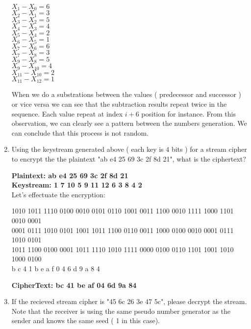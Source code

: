 \documentclass[12]{article}
\begin{document}
\begin{enumerate}
	$X_1 - X_0 = 6$ \\
	$X_2 - X_1 = 3$ \\
	$X_3 - X_2 = 5$ \\
	$X_4 - X_3 = 4$ \\
	$X_5 - X_4 = 2$ \\
	$X_6 - X_5 = 1$ \\
	$X_7 - X_6 = 6$ \\
	$X_7 - X_8 = 3$ \\
	$X_9 - X_8 = 5$ \\
	$X_9 - X_{10} = 4$ \\
	$X_{11} - X_{10} = 2$ \\
	$X_{11} - X_{12} = 1$ 
	
	When  we do a substrations between the  values ( predecessor and successor ) or vice versa we can see that the subtraction results repeat twice in the sequence. Each value repeat at index $i + 6$ position for instance. From this observation, we can clearly see a pattern between the numbers generation. We can conclude that this process is not random.
	
	\item Using the keystream generated above ( each key is $4$ bits ) for a stream cipher to encrypt the the plaintext "ab e4 25 69 3c 2f 8d 21", what is the ciphertext? 
	
	\textbf{Plaintext: ab e4 25 69 3c 2f 8d 21 } \\
	\textbf{Keystream: 1 7 10 5 9 11 12 6 3 8 4 2 }\\
	
	Let's effectuate the encryption:
	\begin{tiny}
	
	1010 1011 1110 0100 0010 0101 0110 1001 0011 1100 0010 1111 1000 1101 0010 0001 \\		
	0001 0111 1010 0101 1001 1011 1100 0110 0011 1000 0100 0010 0001 0111 1010 0101 \\	
	1011 1100 0100 0001 1011 1110 1010 1111 0000 0100 0110 1101 1001 1010 1000 0100 \\
	b		c    4    1    b    e    a    f    0    4    6    d    9    a    8    4 
	\end{tiny}

	\textbf{CipherText:	bc 41 be af 04 6d 9a 84 }	
	
	
	\item If the recieved stream cipher is "45 6c 26 3e 47 5c", please decrypt the stream. Note that the receiver is using the same pseudo number generator as the sender and  knows the same seed ( 1 in this case). 
	

\end{enumerate}
\end{document}
